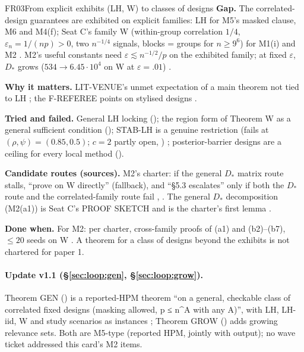 \begin{card}{FR03}{From explicit exhibits (LH, W) to classes of designs}
\textbf{Gap.} The correlated-design guarantees are exhibited on explicit families: LH for M5's masked clause, M6 and M4(f); Seat C's family W (within-group correlation $1/4$, $\varepsilon_n=1/(np)>0$, two $n^{-1/4}$ signals, blocks = groups for $n\ge9^6$) for M1(i) and M2 . M2's useful constants need $\varepsilon\lesssim n^{-1/2}/p$ on the exhibited family; at fixed $\varepsilon$, $D_*$ grows ($534\to6.45\cdot10^4$ on W at $\varepsilon=.01$) .

\textbf{Why it matters.} LIT-VENUE's unmet expectation of a main theorem not tied to LH ; the F-REFEREE points on stylised designs .

\textbf{Tried and failed.} General LH locking (); the region form of Theorem W as a general sufficient condition (); STAB-LH is a genuine restriction (fails at $(\rho,\psi)=(0.85,0.5)$; $c=2$ partly open, ) ; posterior-barrier designs are a ceiling for every local method ().

\textbf{Candidate routes (sources).} M2's charter: if the general $D_*$ matrix route stalls, ``prove on W directly'' (fallback), and ``§5.3 escalates'' only if both the $D_*$ route and the correlated-family route fail , . The general $D_*$ decomposition (M2(a1)) is Seat C's PROOF SKETCH and is the charter's first lemma .

\textbf{Done when.} For M2: per charter, cross-family proofs of (a1) and (b2)--(b7), $\le20$ seeds on W . A theorem for a class of designs beyond the exhibits is not chartered for paper 1.
\paragraph{Update v1.1 (\S\ref{sec:loop:gen}, \S\ref{sec:loop:grow}).} Theorem GEN () is a reported-HPM theorem ``on a general, checkable class of correlated fixed designs (masking allowed, p ≤ n\textasciicircum{}A with any A)'', with LH, LH-iid, W and study scenarios as instances ; Theorem GROW () adds growing relevance sets. Both are M5-type (reported HPM, jointly with output); no wave ticket addressed this card's M2 items.

\end{card}

